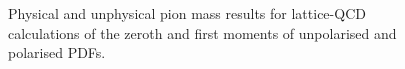 \begin{figure}
\begin{center}
\centerline{
}
\centerline{
}
\centerline{
}
\end{center}
\caption{Physical and unphysical pion mass results for lattice-QCD calculations of the zeroth and first moments
of unpolarised and polarised PDFs.}
\label{fig:latt_res}
\end{figure}
